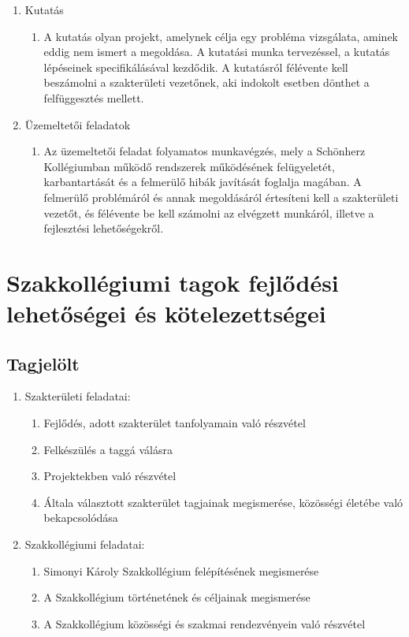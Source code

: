 \documentclass[12pt]{report}
\begin{document}
\begin{enumerate}
  \item Kutatás
  \begin{enumerate}
    \item A kutatás olyan projekt, amelynek célja egy probléma vizsgálata, aminek eddig nem ismert a megoldása. A kutatási munka tervezéssel, a kutatás lépéseinek 
      specifikálásával kezdődik. A kutatásról félévente kell beszámolni a szakterületi vezetőnek, aki indokolt esetben dönthet a felfüggesztés mellett.
  \end{enumerate}

  \item Üzemeltetői feladatok
  \begin{enumerate}
    \item Az üzemeltetői feladat folyamatos munkavégzés, mely a Schönherz Kollégiumban működő rendszerek működésének felügyeletét, karbantartását és a felmerülő hibák javítását 
      foglalja magában. A felmerülő problémáról és annak megoldásáról értesíteni kell a szakterületi vezetőt, és félévente be kell számolni az elvégzett munkáról, illetve a fejlesztési lehetőségekről.
  \end{enumerate}
\end{enumerate}

\section{Szakkollégiumi tagok fejlődési lehetőségei és kötelezettségei}

\subsection{Tagjelölt}

\begin{enumerate}
  \item Szakterületi feladatai:
  \begin{enumerate}
    \item Fejlődés, adott szakterület tanfolyamain való részvétel
    \item Felkészülés a taggá válásra
    \item Projektekben való részvétel
    \item Általa választott szakterület tagjainak megismerése, közösségi életébe való bekapcsolódása
  \end{enumerate}

  \item Szakkollégiumi feladatai:
  \begin{enumerate}
    \item Simonyi Károly Szakkollégium felépítésének megismerése
    \item A Szakkollégium történetének és céljainak megismerése
    \item A Szakkollégium közösségi és szakmai rendezvényein való részvétel
  \end{enumerate}
\end{enumerate}
\end{document}
